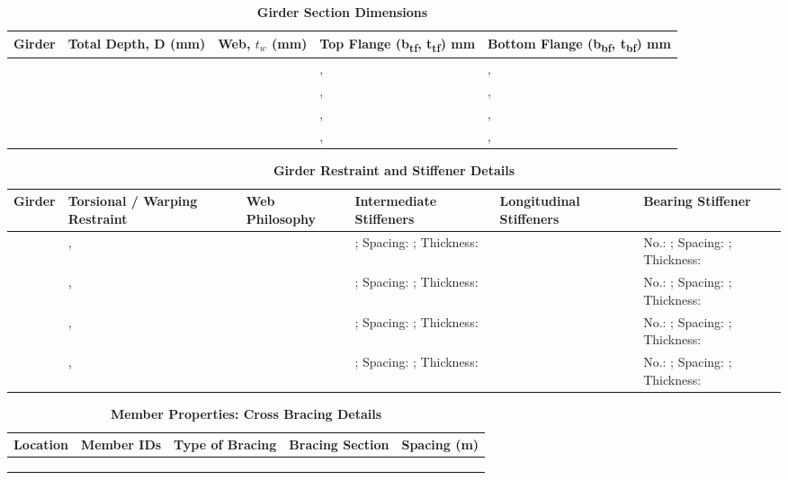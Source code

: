 \documentclass[12pt,a4paper]{report}
\numberwithin{table}{chapter}
\numberwithin{figure}{chapter}
\begin{document}
\vspace{4pt}
\begin{longtable}{|L{1.8cm}|L{2.3cm}|L{1.8cm}|p{4.8cm}|p{4.8cm}|}
\caption{\textbf{Girder Section Dimensions}}\\
\hline
\textbf{Girder} & \textbf{Total Depth, D (mm)} & \textbf{Web, $t_w$ (mm)} & \textbf{Top Flange (b\textsubscript{tf}, t\textsubscript{tf}) mm} & \textbf{Bottom Flange (b\textsubscript{bf}, t\textsubscript{bf}) mm} \\[6pt]
\hline
 &  &  & ,  & ,  \\[8pt]
\hline
 &  &  & ,  & ,  \\[8pt]
\hline
 &  &  & ,  & ,  \\[8pt]
\hline
 &  &  & ,  & ,  \\[8pt]
\hline
\end{longtable}

\vspace{0.6em}

\vspace{4pt}
\begin{longtable}{|L{1.4cm}|p{2.2cm}|p{2.2cm}|p{3.0cm}|p{2.4cm}|p{2.2cm}|}
\caption{\textbf{Girder Restraint and Stiffener Details}}\\
\hline
\textbf{Girder} & \textbf{Torsional / Warping Restraint} & \textbf{Web Philosophy} & \textbf{Intermediate Stiffeners} & \textbf{Longitudinal Stiffeners} & \textbf{Bearing Stiffener} \\[6pt]
\hline
\endfirsthead
\endhead

 & ,  &  & ; Spacing: ; Thickness:  &  & No.: ; Spacing: ; Thickness:  \\[8pt]
\hline
 & ,  &  & ; Spacing: ; Thickness:  &  & No.: ; Spacing: ; Thickness:  \\[8pt]
\hline
 & ,  &  & ; Spacing: ; Thickness:  &  & No.: ; Spacing: ; Thickness:  \\[8pt]
\hline
 & ,  &  & ; Spacing: ; Thickness:  &  & No.: ; Spacing: ; Thickness:  \\[8pt]
\hline
\end{longtable}



\newpage

\vspace{0.4em}
\setlength{\tabcolsep}{4pt}
\setlength\LTleft{0pt}
\setlength\LTright{\fill}

\begin{longtable}{|L{2.2cm}|L{2.2cm}|L{3.0cm}|L{4.0cm}|C{2.0cm}|}
\caption{\textbf{Member Properties: Cross Bracing Details}}\\
\hline
\textbf{Location} & \textbf{Member IDs} & \textbf{Type of Bracing} & \textbf{Bracing Section} & \textbf{Spacing (m)} \\
\hline
 &  &  &  &  \\[6pt]
\hline
 &  &  &  &  \\[6pt]
\hline
 &  &  &  &  \\[6pt]
\hline
\end{longtable}
\end{document}
